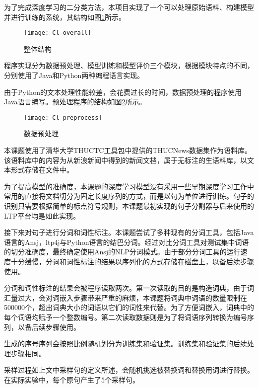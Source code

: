 \label{s:classifer implementation}
为了完成深度学习的二分类方法，本项目实现了一个可以处理原始语料、构建模型并进行训练的系统，其结构如图\ref{f:classfier overall}所示。
\begin{figure}[h]
	\centering
	\texttt{[image: Cl-overall]}
	\caption{整体结构}
	\label{f:classfier overall}
	\vspace{-1em}
\end{figure}

程序实现分为数据预处理、模型训练和模型评价三个模块，根据模块特点的不同，分别使用了Java和Python两种编程语言实现。

\label{s:classfier preprocess}
由于Python的文本处理性能较差，会花费过长的时间，数据预处理的程序使用Java语言编写。预处理程序的结构如图\ref{f:classfier preprocess}所示。

\begin{figure}[h]
	\centering
	\texttt{[image: Cl-preprocess]}
	\caption{数据预处理}
	\label{f:classfier preprocess}
	\vspace{-1em}
\end{figure}

本课题使用了清华大学THUCTC工具包中提供的THUCNews数据集作为语料库。该语料库中的内容为从新浪新闻中得到的新闻文档，属于无标注的生语料库，以文本形式存储在文件中。

为了提高模型的准确度，本课题的深度学习模型没有采用一些早期深度学习工作中常用的直接将文档切分为固定长度序列的方式，而是以句为单位进行训练。句子的识别只需要根据简单的标点符号规则，本课题最初实现的句子分割器与后来使用的LTP平台均是如此实现。

接下来对句子进行分词和词性标注。本课题尝试了多种现有的分词工具，包括Java语言的Ansj，ltp4j与Python语言的结巴分词。经过对比分词工具对测试集中词语的切分准确度，最终确定使用Ansj的NLP分词模式。由于部分分词工具的运行速度十分缓慢，分词和词性标注的结果以序列化的方式存储在磁盘上，以备后续步骤使用。

分词和词性标注的结果会被程序读取两次。第一次读取的目的是构造词典，由于词汇量过大，会对词嵌入步骤带来严重的麻烦，本课题将词典中词语的数量限制在500000个，超出词典大小的词语以它们的词性来代替。为了方便词嵌入，词典中的每个词语均赋予一个整数编号。第二次读取数据则是为了将词语序列转换为编号序列，以备后续步骤使用。

生成的序号序列会按照比例随机划分为训练集和验证集。训练集和验证集的后续处理步骤相同。

采样过程如上文中采样句的定义所述，会随机挑选被替换词和替换用词进行替换。在实际实验中，每个原句产生了5个采样句。


